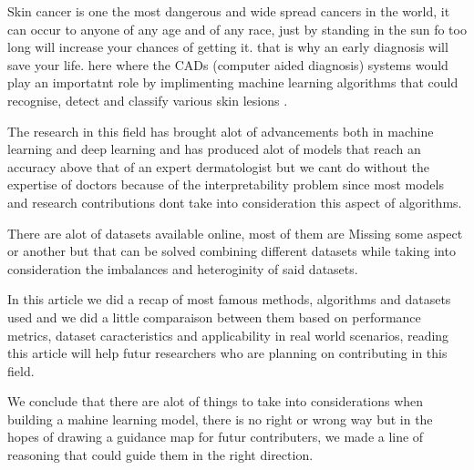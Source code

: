    Skin cancer is one the most dangerous and wide spread cancers in the world, it can occur to anyone of any age and of any race, just by standing in the sun fo too long will increase your chances of getting it. that is why an early diagnosis will save your life. here where the CADs (computer aided diagnosis) systems would play an importatnt role by implimenting machine learning algorithms that could recognise, detect and classify various skin lesions .

    The research in this field has brought alot of advancements both in machine learning and deep learning and has produced alot of models that reach an accuracy above that of an expert dermatologist but we cant do without the expertise of doctors because of the interpretability problem since most models and research contributions dont take into consideration this aspect of algorithms.

    There are alot of datasets available online, most of them are Missing some aspect or another but that can be solved combining different datasets while taking into consideration the imbalances and heteroginity of said datasets.

    In this article we did a recap of most famous methods, algorithms and datasets used and we did a little comparaison between them based on performance metrics, dataset caracteristics and applicability in real world scenarios, reading this article will help futur researchers who are planning on contributing in this field.
    
    We conclude that there are alot of things to take into considerations when building a mahine learning model, there is no right or wrong way but in the hopes of drawing a guidance map for futur contributers, we made a line of reasoning that could guide them in the right direction. 





